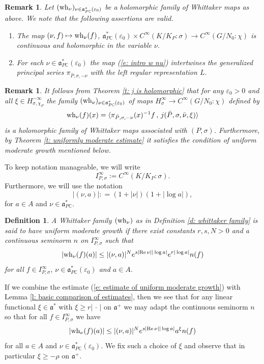 \documentclass[12pt,a4paper]{article}
\newtheorem{Defi}[Thm]{Definition}
\newtheorem{Rem}[Thm]{Remark}
\newenvironment{defi}[0]{\begin{Defi}\noindent\rm}%
{\end{Defi}}
\newenvironment{rem}[0]{\begin{Rem}\noindent\rm}%
{\end{Rem}}
\def\naam#1{\label{#1}}
\def\itema{\vspace{-1mm}\item[{\rm (a)}]}
\def\itemb{\item[{\rm (b)}]}
\def\msy#1{{\mathbb #1}}
\def\C{{\msy C}}
\def\ge{\varepsilon}
\def\gs{\sigma}
\def\got#1{\mathfrak #1}
\def\fa{{\got a}}
\def\to{\rightarrow}
\def\Re{{\rm Re}\,}
\def\inp#1#2{\langle#1\,,\,#2\rangle}
\def\iC{{\scriptscriptstyle \C}}
\numberwithin{Thm}{section}
\numberwithin{equation}{section}
\def\dotvar{\, \cdot\,}
\def\faPdc{{\fa_{P\iC}^*}}
\numberwithin{equation}{section}
\def\fad{{\fa^*}}
\def\faPdc{\fa_{P\iC}^*}
\def\snorm{n}
\def\IPgs{I_{P,\gs}^\infty}
\def\wh{{\rm wh}}
\def\col{\!:\!}
\def\cchi{\chi}
\def\xxi{\xi}
\def\gsP{\gs}%
\begin{document}
\begin{rem}
\label{r: properties Whit map}
Let $(\wh_\nu)_{\nu \in \faPdc(\ge_0)}$ be a holomorphic family of Whittaker maps as above. 
We note that the following assertions
are valid.
\begin{enumerate}
\itema
The map $(\nu, f) \mapsto \wh_\nu(f)$,  $\faPdc(\ge_0) \times C^\infty(K/K_P:\gs) \to C^\infty(G/N_0\col \cchi)$ is continuous and holomorphic in the variable $\nu.$ 
\itemb
For each $\nu \in \faPdc(\ge_0)$ the map (\ref{e: intro w nu}) intertwines the generalized
principal series $\pi_{\bar P, \gs, -\nu}$
with the left regular representation $L.$ 
\end{enumerate}
\end{rem}

\begin{rem}
\label{r: example Whittaker family}
It follows from  Theorem \ref{t: j is holomorphic}
that for any $\ge_0 > 0$ and all $\xxi \in H_{\gs,\cchi_P}^{-\infty}$ 
the family $(\wh_\nu)_{\nu \in \faPdc(\ge_0)}$ of maps $H_\gs^\infty \to C^\infty(G/N_0\col  \cchi)$ defined by
$$ 
\wh_{\nu}(f)(x) = \inp{\pi_{\bar P, \gs, -\nu}(x)^{-1} f}{j(\bar P, \gs, \bar \nu, \xxi)}
$$ 
is a holomorphic family of Whittaker maps associated with $(P,\gs)$. 
Furthermore, 
by Theorem \ref{t: uniformly moderate estimate} it satisfies
the condition of uniform moderate growth mentioned below.
\end{rem}

To keep notation manageable, we will write
\begin{equation}
\label{e: notation IPgs}
\IPgs:= C^\infty(K/K_P:\gsP).
\end{equation}
Furthermore, we will use
the notation 
$$ 
|(\nu, a)|: =  (1 + |\nu|)(1+ |\log a|), 
$$%
for $a \in A$ and $\nu \in \faPdc.$ 

\begin{defi}
A Whittaker family $(\wh_\nu)$ as in Definition \ref{d: whittaker family} 
is said to have {\em uniform moderate growth} if there exist constants 
$r, s, N > 0$ and  
a continuous seminorm $\snorm$ on $\IPgs$  such that 
\begin{equation}
\label{e: estimate of uniform moderate growth}
|\wh_\nu(f)(a)| \leq  |(\nu,a)|^N  e^{s |\Re \nu| |\log a| } e^{r|\log a|} \snorm(f)
\end{equation} 
for all $f \in \IPgs$, $\nu \in \faPdc(\ge_0)$ and $a \in A.$ 
\end{defi}
If we combine the estimate (\ref{e: estimate of uniform moderate growth})
%
with Lemma \ref{l: basic comparison of estimates}, then
we see that for any linear functional $\xxi \in \fad$ with $\xxi \geq r|\dotvar|$ 
on $\fa^+$
we may adapt the continuous seminorm $\snorm$ so that 
for all 
$f\in \IPgs$ we have
\begin{equation}
\naam{e: domination whittaker family}
|\wh_\nu(f)(a)| \leq  |(\nu,a)|^N e^{s |\Re \nu| |\log a| } a^\xxi \snorm(f)
\end{equation}
for all $a \in A$ and $\nu \in \faPdc(\ge_0).$ 
We fix such a choice of $\xxi$ and observe that in particular $\xxi \geq -\rho $ 
on $\fa^+.$ 
\end{document}
